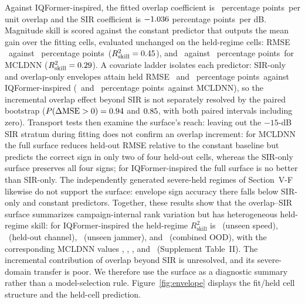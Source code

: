 \documentclass[letterpaper,journal]{IEEEtran}
\newcommand{\pp}{percentage points}
\begin{document}
Against IQFormer-inspired, the fitted overlap coefficient is
\EnvelopeIqformerOccupancySlope\ \pp\ per unit overlap and the SIR
coefficient is $-1.036$ \pp\ per dB. Magnitude skill is
scored against the constant predictor that outputs the mean gain over the
fitting cells, evaluated unchanged on the held-regime cells: RMSE
\EnvelopeIqformerHoldoutRmse\ against \EnvelopeConstantRmseIQ\ \pp\
($R^2_{\mathrm{skill}}=0.45$), and
\EnvelopeMcldnnHoldoutRmse\ against \EnvelopeConstantRmseMC\ \pp\ for MCLDNN
($R^2_{\mathrm{skill}}=0.29$). A covariate ladder isolates
each predictor: SIR-only and overlap-only envelopes attain held RMSE
\LadderSirOnlyRmseIQ\ and \LadderOverlapOnlyRmseIQ\ \pp\ against
IQFormer-inspired (\LadderSirOnlyRmseMC\ and \LadderOverlapOnlyRmseMC\ \pp\
against MCLDNN), so the incremental overlap effect beyond SIR is not
separately resolved by the paired bootstrap
($P(\Delta\mathrm{MSE}>0)=0.94$ and $0.85$, with both
paired intervals including zero). Transport tests then examine the surface's
reach: leaving out the $-15$-dB SIR stratum during fitting does not confirm an
overlap increment: for MCLDNN the full surface reduces held-out RMSE relative
to the constant baseline but predicts the correct sign in only two of four
held-out cells, whereas the SIR-only surface preserves all four signs; for
IQFormer-inspired the full surface is no better than SIR-only. The
independently generated severe-held regimes of Section~V-F likewise do not
support the surface: envelope sign accuracy there falls below SIR-only and
constant predictors. Together, these results show that the overlap--SIR
surface summarizes campaign-internal rank variation but has heterogeneous
held-regime skill: for IQFormer-inspired the held-regime
$R^2_{\mathrm{skill}}$ is \RegimeSkillIqSpeed\ (unseen speed),
\RegimeSkillIqChannel\ (held-out channel), \RegimeSkillIqJammer\ (unseen
jammer), and \RegimeSkillIqOod\ (combined OOD), with the corresponding MCLDNN
values \RegimeSkillMcSpeed, \RegimeSkillMcChannel, \RegimeSkillMcJammer, and
\RegimeSkillMcOod\ (Supplement Table~II). The incremental contribution of
overlap beyond SIR is unresolved, and its severe-domain transfer is poor. We
therefore use the surface as a diagnostic summary rather than a
model-selection rule. Figure~\ref{fig:envelope} displays the fit/held cell
structure and the held-cell prediction.
\end{document}
